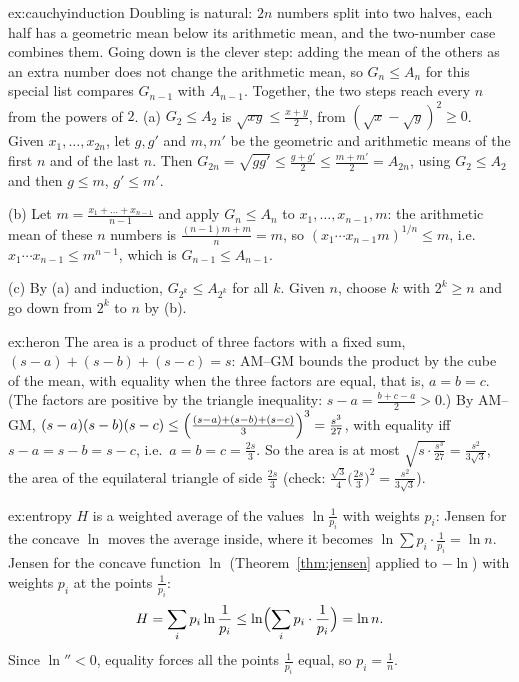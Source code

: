 \begin{solution}{ex:cauchyinduction}
\idea Doubling is natural: $2n$ numbers split into two halves, each half has a geometric mean below its arithmetic mean, and the two-number case combines them. Going down is the clever step: adding the mean of the others as an extra number does not change the arithmetic mean, so $G_n\le A_n$ for this special list compares $G_{n-1}$ with $A_{n-1}$. Together, the two steps reach every $n$ from the powers of $2$.
\writeup (a) $G_2\le A_2$ is $\sqrt{xy}\le\frac{x+y}2$, from $(\sqrt x-\sqrt y)^2\ge0$. Given $x_1,\dots,x_{2n}$, let $g,g'$ and $m,m'$ be the geometric and arithmetic means of the first $n$ and of the last $n$. Then $G_{2n}=\sqrt{gg'}\le\frac{g+g'}2\le\frac{m+m'}2=A_{2n}$, using $G_2\le A_2$ and then $g\le m$, $g'\le m'$.

(b) Let $m=\frac{x_1+\dots+x_{n-1}}{n-1}$ and apply $G_n\le A_n$ to $x_1,\dots,x_{n-1},m$: the arithmetic mean of these $n$ numbers is $\frac{(n-1)m+m}n=m$, so $(x_1\cdots x_{n-1}m)^{1/n}\le m$, i.e.\ $x_1\cdots x_{n-1}\le m^{n-1}$, which is $G_{n-1}\le A_{n-1}$.

(c) By (a) and induction, $G_{2^k}\le A_{2^k}$ for all $k$. Given $n$, choose $k$ with $2^k\ge n$ and go down from $2^k$ to $n$ by (b).
\end{solution}

\begin{solution}{ex:heron}
\idea The area is a product of three factors with a fixed sum, $(s-a)+(s-b)+(s-c)=s$: AM--GM bounds the product by the cube of the mean, with equality when the three factors are equal, that is, $a=b=c$. (The factors are positive by the triangle inequality: $s-a=\frac{b+c-a}2>0$.)
\writeup By AM--GM, $(s-a)(s-b)(s-c)\le\Bigl(\frac{(s-a)+(s-b)+(s-c)}3\Bigr)^3=\frac{s^3}{27}$, with equality iff $s-a=s-b=s-c$, i.e.\ $a=b=c=\frac{2s}3$. So the area is at most $\sqrt{s\cdot\frac{s^3}{27}}=\frac{s^2}{3\sqrt3}$, the area of the equilateral triangle of side $\frac{2s}3$ (check: $\frac{\sqrt3}4\bigl(\frac{2s}3\bigr)^2=\frac{s^2}{3\sqrt3}$).
\end{solution}

\begin{solution}{ex:entropy}
\idea $H$ is a weighted average of the values $\ln\frac1{p_i}$ with weights $p_i$: Jensen for the concave $\ln$ moves the average inside, where it becomes $\ln\sum p_i\cdot\frac1{p_i}=\ln n$.
\writeup Jensen for the concave function $\ln$ (Theorem~\ref{thm:jensen} applied to $-\ln$) with weights $p_i$ at the points $\frac1{p_i}$:
\[
H=\sum_ip_i\ln\frac1{p_i}\le\ln\Bigl(\sum_ip_i\cdot\frac1{p_i}\Bigr)=\ln n.
\]
Since $\ln''<0$, equality forces all the points $\frac1{p_i}$ equal, so $p_i=\frac1n$.
\end{solution}

